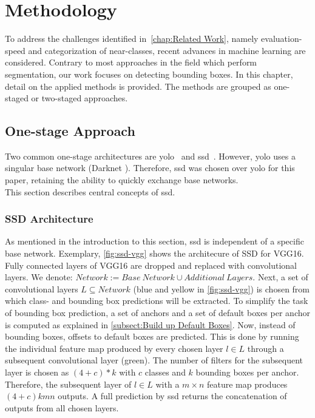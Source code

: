 \chapter{Methodology}\label{chap:Methodology}
To address the challenges identified in~\autoref{chap:Related Work}, namely evaluation-speed and categorization of near-classes, recent advances in machine learning are considered. Contrary to most approaches in the field which perform segmentation, our work focuses on detecting bounding boxes. In this chapter, detail on the applied methods is provided. The methods are grouped as one-staged or two-staged approaches. 

\section{One-stage Approach} Two common one-stage architectures are \gls{yolo}~\cite{Redmon.08.06.2015, Redmon.25.12.2016, Redmon.09.04.2018} and \gls{ssd}~\cite{Liu.2016}. However, \gls{yolo} uses a singular base network (Darknet \cite{JosephRedmon.20132016}). Therefore, \gls{ssd} was chosen over \gls{yolo} for this paper, retaining the ability to quickly exchange base networks.\\
This section describes central concepts of \gls{ssd}.

\subsection{SSD Architecture}\label{subsect:SSD Architecture}
As mentioned in the introduction to this section, \gls{ssd} is independent of a specific base network. Exemplary, \autoref{fig:ssd-vgg} shows the architecure of SSD for VGG16. Fully connected \glspl{layer} of VGG16 are dropped and replaced with \glspl{convolutional layer}. We denote: \(Network:=Base\ Network\cup{}Additional\ Layers\). Next, a set of \glspl{convolutional layer} \(L\subseteq Network\) (blue and yellow in \autoref{fig:ssd-vgg})  is chosen from which class- and bounding box predictions will be extracted. To simplify the task of bounding box prediction, a set of \glspl{anchor} and a set of default boxes per \gls{anchor} is computed as explained in \autoref{subsect:Build up Default Boxes}. Now, instead of bounding boxes, offsets to default boxes are predicted. This is done by running the individual \gls{feature map} produced by every chosen \gls{layer} \(l\in L\) through a subsequent \gls{convolutional layer} (green). The number of filters for the subsequent \gls{layer} is chosen as \((4+c)*k\) with \(c\) classes and \(k\) bounding boxes per \gls{anchor}. Therefore, the subsequent \gls{layer} of \(l\in L\) with a \(m\times n\) \gls{feature map} produces \((4+c)kmn\) outputs. A full prediction by \gls{ssd} returns the concatenation of outputs from all chosen \glspl{layer}.

